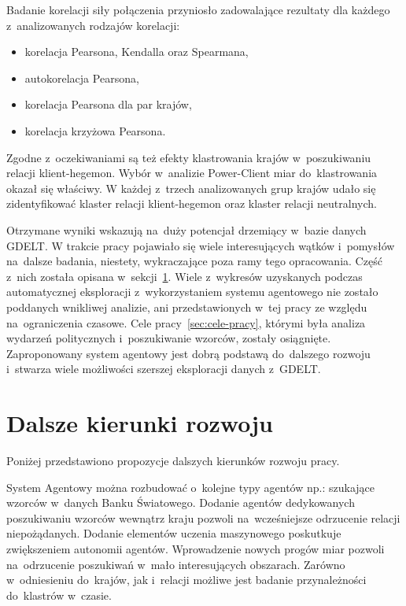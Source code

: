 \documentclass[11pt]{report}
\begin{document}
    Badanie korelacji siły połączenia przyniosło zadowalające rezultaty dla każdego z~analizowanych rodzajów korelacji:
    \begin{itemize}
        \item korelacja Pearsona, Kendalla oraz Spearmana,
        \item autokorelacja Pearsona,
        \item korelacja Pearsona dla par krajów,
        \item korelacja krzyżowa Pearsona.
    \end{itemize}

    Zgodne z~oczekiwaniami są też efekty klastrowania krajów w~poszukiwaniu relacji klient-hegemon.
    Wybór w~analizie Power-Client miar do~klastrowania okazał się właściwy.
    W każdej z~trzech analizowanych grup krajów udało się zidentyfikować klaster relacji klient-hegemon oraz klaster relacji neutralnych.

    Otrzymane wyniki wskazują na~duży potencjał drzemiący w~bazie danych GDELT\@.
    W trakcie pracy pojawiało się wiele interesujących wątków i~pomysłów na~dalsze badania, niestety, wykraczające poza ramy tego opracowania.
    Część z~nich została opisana w~sekcji~\ref{sec:dalsze-kierunki-rozwoju}.
    Wiele z~wykresów uzyskanych podczas automatycznej eksploracji z~wykorzystaniem systemu agentowego nie zostało poddanych wnikliwej analizie,
    ani przedstawionych w~tej pracy ze względu na~ograniczenia czasowe.
    Cele pracy~\ref{sec:cele-pracy}, którymi była analiza wydarzeń politycznych i~poszukiwanie wzorców, zostały osiągnięte.
    Zaproponowany system agentowy jest dobrą podstawą do~dalszego rozwoju i~stwarza wiele możliwości szerszej eksploracji danych z~GDELT\@.


    \section{Dalsze kierunki rozwoju}\label{sec:dalsze-kierunki-rozwoju}
    Poniżej przedstawiono propozycje dalszych kierunków rozwoju pracy.

    System Agentowy można rozbudować o~kolejne typy agentów np.: szukające wzorców w~danych Banku Światowego.
    Dodanie agentów dedykowanych poszukiwaniu wzorców wewnątrz kraju pozwoli na~wcześniejsze odrzucenie relacji niepożądanych.
    Dodanie elementów uczenia maszynowego poskutkuje zwiększeniem autonomii agentów.
    Wprowadzenie nowych progów miar pozwoli na~odrzucenie poszukiwań w~mało interesujących obszarach.
    Zarówno w~odniesieniu do~krajów, jak i~relacji możliwe jest badanie przynależności do~klastrów w~czasie.
\end{document}
